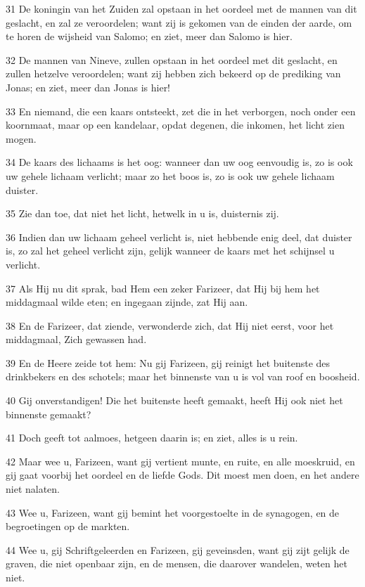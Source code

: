 \par 31 De koningin van het Zuiden zal opstaan in het oordeel met de mannen van dit geslacht, en zal ze veroordelen; want zij is gekomen van de einden der aarde, om te horen de wijsheid van Salomo; en ziet, meer dan Salomo is hier.
\par 32 De mannen van Nineve, zullen opstaan in het oordeel met dit geslacht, en zullen hetzelve veroordelen; want zij hebben zich bekeerd op de prediking van Jonas; en ziet, meer dan Jonas is hier!
\par 33 En niemand, die een kaars ontsteekt, zet die in het verborgen, noch onder een koornmaat, maar op een kandelaar, opdat degenen, die inkomen, het licht zien mogen.
\par 34 De kaars des lichaams is het oog: wanneer dan uw oog eenvoudig is, zo is ook uw gehele lichaam verlicht; maar zo het boos is, zo is ook uw gehele lichaam duister.
\par 35 Zie dan toe, dat niet het licht, hetwelk in u is, duisternis zij.
\par 36 Indien dan uw lichaam geheel verlicht is, niet hebbende enig deel, dat duister is, zo zal het geheel verlicht zijn, gelijk wanneer de kaars met het schijnsel u verlicht.
\par 37 Als Hij nu dit sprak, bad Hem een zeker Farizeer, dat Hij bij hem het middagmaal wilde eten; en ingegaan zijnde, zat Hij aan.
\par 38 En de Farizeer, dat ziende, verwonderde zich, dat Hij niet eerst, voor het middagmaal, Zich gewassen had.
\par 39 En de Heere zeide tot hem: Nu gij Farizeen, gij reinigt het buitenste des drinkbekers en des schotels; maar het binnenste van u is vol van roof en boosheid.
\par 40 Gij onverstandigen! Die het buitenste heeft gemaakt, heeft Hij ook niet het binnenste gemaakt?
\par 41 Doch geeft tot aalmoes, hetgeen daarin is; en ziet, alles is u rein.
\par 42 Maar wee u, Farizeen, want gij vertient munte, en ruite, en alle moeskruid, en gij gaat voorbij het oordeel en de liefde Gods. Dit moest men doen, en het andere niet nalaten.
\par 43 Wee u, Farizeen, want gij bemint het voorgestoelte in de synagogen, en de begroetingen op de markten.
\par 44 Wee u, gij Schriftgeleerden en Farizeen, gij geveinsden, want gij zijt gelijk de graven, die niet openbaar zijn, en de mensen, die daarover wandelen, weten het niet.
